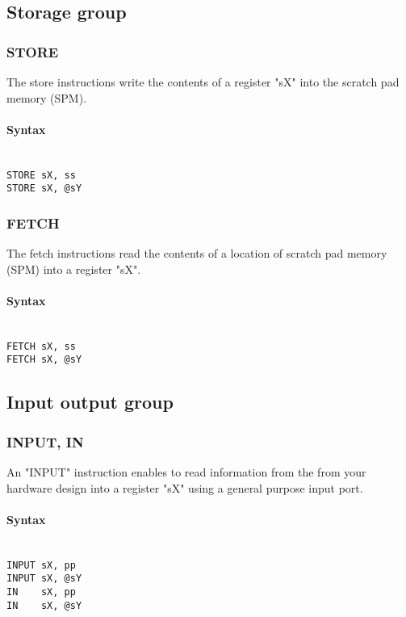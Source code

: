     \subsection{Storage group}
        \subsubsection{STORE}
            The store instructions write the contents of a register "sX" into the scratch pad memory (SPM).

            \paragraph{Syntax}
                ~\\
                \verb'STORE sX, ss'\\
                \verb'STORE sX, @sY'

        \subsubsection{FETCH}
            The fetch instructions read the contents of a location of scratch pad memory (SPM) into a register "sX".

            \paragraph{Syntax}
                ~\\
                \verb'FETCH sX, ss'\\
                \verb'FETCH sX, @sY'

    \subsection{Input output group}
        \subsubsection{INPUT, IN}
            An "INPUT" instruction enables to read information from the from your hardware design into a register "sX" using a general purpose input port.

            \paragraph{Syntax}
                ~\\
                \verb'INPUT sX, pp'\\
                \verb'INPUT sX, @sY'\\
                \verb'IN    sX, pp'\\
                \verb'IN    sX, @sY'

